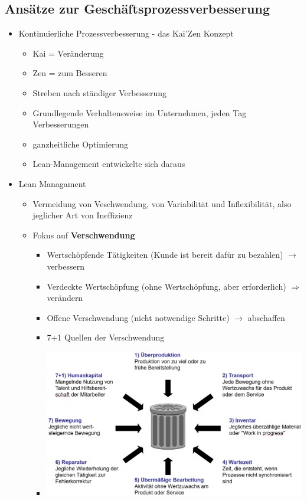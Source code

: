 \documentclass[11pt,a4paper]{article}
\begin{document}
\subsection{Ansätze zur Geschäftsprozessverbesserung}
\begin{itemize}
\item Kontinuierliche Prozessverbesserung - das Kai'Zen Konzept
	\begin{itemize}
	\item Kai = Veränderung
	\item Zen = zum Besseren
	\item Streben nach ständiger Verbesserung
	\item Grundlegende Verhaltensweise im Unternehmen, jeden Tag Verbesserungen
	\item ganzheitliche Optimierung
	\item Lean-Management entwickelte sich daraus
	\end{itemize}
	
\item Lean Managament
	\begin{itemize}
	\item Vermeidung von Veschwendung, von Variabilität und Inflexibilität, also jeglicher Art von Ineffizienz
	\item Fokus auf \textbf{Verschwendung}
		\begin{itemize}
		\item Wertschöpfende Tätigkeiten (Kunde ist bereit dafür zu bezahlen) $\rightarrow$ verbessern
		\item Verdeckte Wertschöpfung (ohne Wertschöpfung, aber erforderlich) $\Rightarrow$ verändern
		\item Offene Verschwendung (nicht notwendige Schritte) $\rightarrow$ abschaffen
		\item 7+1 Quellen der Verschwendung
		\vspace{0.3cm}
		\item[]	\includegraphics[width=15cm]{verschwendung}				
		\end{itemize}
	

\end{itemize}
\end{itemize}
\end{document}
